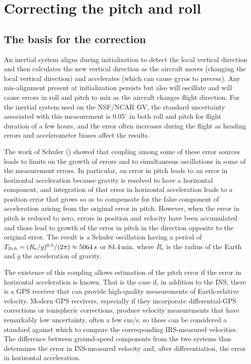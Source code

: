 \documentclass[english,british,amtd,bookmarks=false,unicode=true]{copernicus}\usepackage[]{graphicx}\usepackage[]{color}
\begin{document}
\section{Correcting the pitch and roll\label{sec:Correcting-the-pitch}}


\subsection{The basis for the correction\label{sub:Sect2.1}}

An inertial system aligns during initialization to detect the local
vertical direction and then calculates the new vertical direction
as the aircraft moves (changing the local vertical direction) and
accelerates (which can cause gyros to precess). Any mis-alignment
present at initialization persists but also will oscillate and will
cause errors in roll and pitch to mix as the aircraft changes flight
direction. For the inertial system used on the NSF/NCAR GV, the standard
uncertainty associated with this measurement is 0.05$^{\circ}$ in
both roll and pitch for flight duration of a few hours, and the error
often increases during the flight as heading errors and accelerometer
biases affect the results. 

The work of Schuler (\citet{Schuler1923}) showed that coupling among
some of these error sources leads to limits on the growth of errors
and to simultaneous oscillations in some of the measurement errors.
In particular, an error in pitch leads to an error in horizontal acceleration
because gravity is resolved to have a horizontal component, and integration
of that error in horizontal acceleration leads to a position error
that grows so as to compensate for the false component of acceleration
arising from the original error in pitch. However, when the error
in pitch is reduced to zero, errors in position and velocity have
been accumulated and those lead to growth of the error in pitch in
the direction opposite to the original error. The result is a Schuler
oscillation having a period of $T_{Sch}=(R_{e}/g)^{0.5}/(2\pi)\approx5064\thinspace s$
or 84.4\,min, where $R_{e}$ is the radius of the Earth and $g$
the acceleration of gravity. 

The existence of this coupling allows estimation of the pitch error
if the error in horizontal acceleration is known. That is the case
if, in addition to the INS, there is a GPS receiver that can provide
high-quality measurements of Earth-relative velocity. Modern GPS receivers,
especially if they incorporate differential-GPS corrections or ionispheric
corrections, produce velocity measurements that have remarkably low
uncertainty, often a few cm/s, so these can be considered a standard
against which to compare the corresponding IRS-measured velocities.
The difference between ground-speed components from the two systems
thus determines the error in INS-measured velocity and, after differentiation,
the error in horizontal acceleration.
\end{document}
